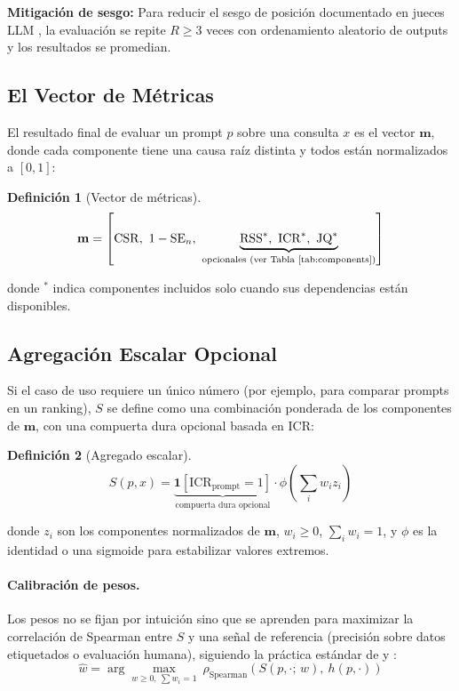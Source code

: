 \documentclass[11pt,a4paper]{article}
\newtheorem{definition}{Definición}
\begin{document}
\noindent \textbf{Mitigación de sesgo:} Para reducir el sesgo de posición documentado en jueces LLM \citep{geval2023}, la evaluación se repite $R \geq 3$ veces con ordenamiento aleatorio de outputs y los resultados se promedian.

\subsection{El Vector de Métricas}

El resultado final de evaluar un prompt $p$ sobre una consulta $x$ es el vector $\mathbf{m}$, donde cada componente tiene una causa raíz distinta y todos están normalizados a $[0, 1]$:

\begin{definition}[Vector de métricas]
\[
\mathbf{m} = \left[\mathrm{CSR},\ 1 - \mathrm{SE}_n,\ \underbrace{\mathrm{RSS}^*,\ \mathrm{ICR}^*,\ \mathrm{JQ}^*}_{\text{opcionales (ver Tabla~\ref{tab:components})}}\right]
\]
\end{definition}

\noindent donde ${}^*$ indica componentes incluidos solo cuando sus dependencias están disponibles.

\subsection{Agregación Escalar Opcional}

Si el caso de uso requiere un único número (por ejemplo, para comparar prompts en un ranking), $S$ se define como una combinación ponderada de los componentes de $\mathbf{m}$, con una compuerta dura opcional basada en ICR:

\begin{definition}[Agregado escalar]
\[
S(p, x) = \underbrace{\mathbf{1}\left[\mathrm{ICR}_\mathrm{prompt} = 1\right]}_{\text{compuerta dura opcional}} \cdot \phi\!\left(\sum_{i} w_i z_i\right)
\]
\end{definition}

\noindent donde $z_i$ son los componentes normalizados de $\mathbf{m}$, $w_i \geq 0$, $\sum_i w_i = 1$, y $\phi$ es la identidad o una sigmoide para estabilizar valores extremos.

\paragraph{Calibración de pesos.}
Los pesos no se fijan por intuición sino que se aprenden para maximizar la correlación de Spearman entre $S$ y una señal de referencia (precisión sobre datos etiquetados o evaluación humana), siguiendo la práctica estándar de \citet{glape2024} y \citet{geval2023}:
\[
\hat{w} = \arg\max_{w \geq 0,\ \sum w_i = 1}\ \rho_\mathrm{Spearman}\!\left(S(p, \cdot;\, w),\ h(p, \cdot)\right)
\]
\end{document}
